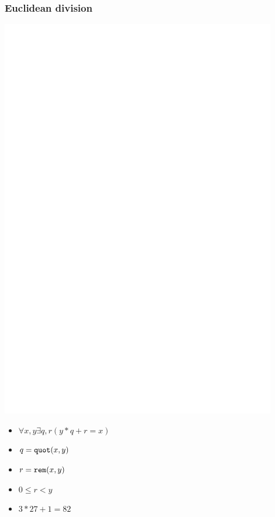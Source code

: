 \documentclass[aspectratio=169]{beamer}
\begin{document}
\begin{frame}[fragile]
\frametitle{Euclidean division}
\begin{minipage}{0.4\textwidth}
\includegraphics[width=0.9\textwidth]{diagrams/euclidean_division_negated.png}\\
\end{minipage}
\begin{minipage}{0.5\textwidth}
\begin{itemize}
\item $\forall x, y \exists q, r (y*q + r = x)$
\item $q = \verb|quot|(x, y)$
\item $r = \verb|rem|(x, y)$
\item $0 \le r < y$
\item $3 * 27 + 1 = 82$
\end{itemize}
\end{minipage}
\end{frame}
\end{document}

